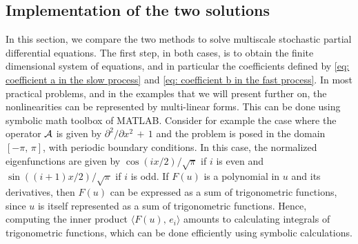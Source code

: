 \subsection{Implementation of the two solutions}
\label{sec: Implementation of the two solutions}
In this section, we compare the two methods to solve multiscale stochastic partial differential equations.
The first step, in both cases, is to obtain the finite dimensional system of equations, and in particular the coefficients defined by \cref{eq: coefficient a in the slow process} and \cref{eq: coefficient b in the fast process}.
In most practical problems, and in the examples that we will present further on,  the nonlinearities can be represented by multi-linear forms.
This can be done using symbolic math toolbox of MATLAB.
Consider for example the case where the operator $\mathcal A$ is given by ${\partial}^2/{\partial}x^2 \,+\,1$ and the problem is posed in the domain $[-{\pi},\,{\pi}]$, with periodic boundary conditions.
In this case, the normalized eigenfunctions are given by $\cos(ix/2)/\sqrt{\pi}$ if $i$ is even and $\sin((i+1)x/2)/\sqrt{\pi}$ if $i$ is odd.
If $F(u)$ is a polynomial in $u$ and its derivatives, then $F(u)$ can be expressed as a sum of trigonometric functions, since $u$ is itself represented as a sum of trigonometric functions.
Hence, computing the inner product $\langle F(u),\, e_i \rangle$ amounts to
calculating integrals of trigonometric functions, which can be done efficiently using symbolic calculations.

